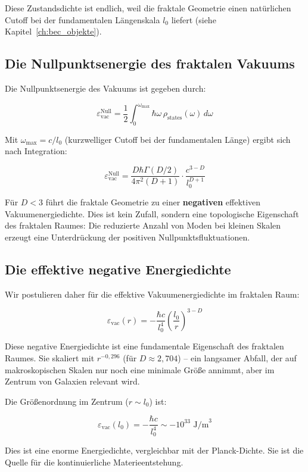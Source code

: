 Diese Zustandsdichte ist endlich, weil die fraktale Geometrie einen natürlichen Cutoff bei der fundamentalen Längenskala \( l_0 \) liefert (siehe Kapitel~\ref{ch:bec_objekte}).

\subsection{Die Nullpunktsenergie des fraktalen Vakuums}
\label{sub:materieentstehung_nullpunkt}

Die Nullpunktsenergie des Vakuums ist gegeben durch:

\[
\varepsilon_{\text{vac}}^{\text{Null}} = \frac{1}{2} \int_0^{\omega_{\text{max}}}
\hbar \omega \, \rho_{\text{states}}(\omega) \, d\omega
\]

Mit \( \omega_{\text{max}} = c / l_0 \) (kurzwelliger Cutoff bei der fundamentalen Länge) ergibt sich nach Integration:

\[
\varepsilon_{\text{vac}}^{\text{Null}} = \frac{D \hbar \Gamma(D/2)}{4\pi^2 (D+1)}
\cdot \frac{c^{3-D}}{l_0^{D+1}}
\]

Für \( D < 3 \) führt die fraktale Geometrie zu einer \textbf{negativen} effektiven Vakuumenergiedichte. Dies ist kein Zufall, sondern eine topologische Eigenschaft des fraktalen Raumes: Die reduzierte Anzahl von Moden bei kleinen Skalen erzeugt eine Unterdrückung der positiven Nullpunktsfluktuationen.

\subsection{Die effektive negative Energiedichte}
\label{sub:materieentstehung_negativ}

Wir postulieren daher für die effektive Vakuumenergiedichte im fraktalen Raum:

\[
\boxed{\varepsilon_{\text{vac}}(r) = -\frac{\hbar c}{l_0^4} \left( \frac{l_0}{r} \right)^{3-D}}
\]

Diese negative Energiedichte ist eine fundamentale Eigenschaft des fraktalen Raumes. Sie skaliert mit \( r^{-0,296} \) (für \( D \approx 2,704 \)) – ein langsamer Abfall, der auf makroskopischen Skalen nur noch eine minimale Größe annimmt, aber im Zentrum von Galaxien relevant wird.

Die Größenordnung im Zentrum (\( r \sim l_0 \)) ist:

\[
\varepsilon_{\text{vac}}(l_0) = -\frac{\hbar c}{l_0^4} \sim -10^{33} \text{ J/m}^3
\]

Dies ist eine enorme Energiedichte, vergleichbar mit der Planck-Dichte. Sie ist die Quelle für die kontinuierliche Materieentstehung.

